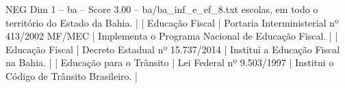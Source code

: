 \begin{textsample}{NEG Dim 1 – ba – Score 3.00 – ba/ba\_inf\_e\_ef\_8.txt}
escolas, em todo o território do Estado da Bahia. | | Educação Fiscal | Portaria Interministerial nº 413/2002 MF/MEC | Implementa o Programa Nacional de Educação Fiscal. | | Educação Fiscal | Decreto Estadual nº 15.737/2014 | Institui a Educação Fiscal na Bahia. | | Educação para o Trânsito | Lei Federal nº 9.503/1997 | Institui o Código de Trânsito Brasileiro. |

\end{textsample}
